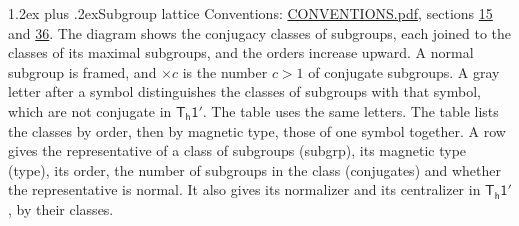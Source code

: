 \documentclass[10pt,a4paper]{article}
\makeatletter
\renewcommand\section{\@startsection{section}{1}{\z@}{-3ex plus -1ex minus -.2ex}%
  {1.2ex plus .2ex}{\normalfont\large\sffamily\bfseries\color{parttitle}}}
\numberwithin{equation}{section}
\newcommand{\grp}[1]{\mathsf{#1}}
\makeatother
\begin{document}
\section{Subgroup lattice}\label{s:subgroups}
Conventions: \href{../../CONVENTIONS.pdf}{CONVENTIONS.pdf}, sections \href{../../../rotation/CONVENTIONS.pdf\#conv.15}{15} and \href{../../CONVENTIONS.pdf\#conv.36}{36}.
The diagram shows the conjugacy classes of subgroups, each joined to the classes of its maximal subgroups, and the orders increase upward. \label{n:index.conjugates.c}\label{n:mark.conjugates}A normal subgroup is framed, and ${\times}c$ is the number $c > 1$ of conjugate subgroups. \label{n:mark.letter}A gray letter after a symbol distinguishes the classes of subgroups with that symbol, which are not conjugate in $\grp{T_{h}1'}$. The table uses the same letters. The table lists the classes by order, then by magnetic type, those of one symbol together. \label{n:head.subgroup}\label{n:head.magnetic.type}\label{n:head.order}\label{n:head.conjugates}\label{n:head.normal}A row gives the representative of a class of subgroups (subgrp), its magnetic type (type), its order, the number of subgroups in the class (conjugates) and whether the representative is normal. \label{n:head.normalizer}\label{n:head.centralizer}It also gives its normalizer and its centralizer in $\grp{T_{h}1'}$, by their classes. 
\end{document}
